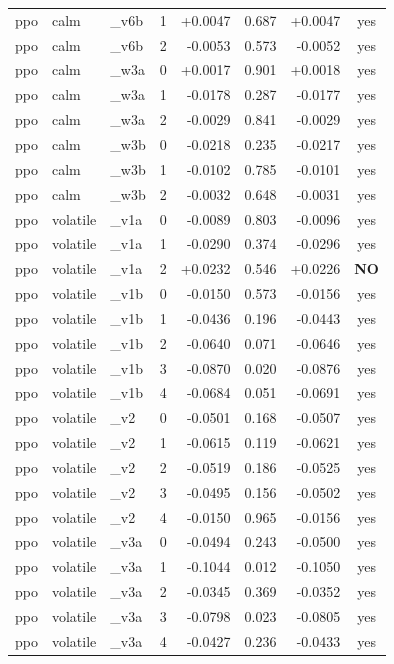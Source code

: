 \documentclass[11pt]{article}
\begin{document}
\begin{center}
\begin{longtable}{lllrrrrc}
ppo & calm & \_v6b & 1 & +0.0047 & 0.687 & +0.0047 & yes \\
ppo & calm & \_v6b & 2 & -0.0053 & 0.573 & -0.0052 & yes \\
ppo & calm & \_w3a & 0 & +0.0017 & 0.901 & +0.0018 & yes \\
ppo & calm & \_w3a & 1 & -0.0178 & 0.287 & -0.0177 & yes \\
ppo & calm & \_w3a & 2 & -0.0029 & 0.841 & -0.0029 & yes \\
ppo & calm & \_w3b & 0 & -0.0218 & 0.235 & -0.0217 & yes \\
ppo & calm & \_w3b & 1 & -0.0102 & 0.785 & -0.0101 & yes \\
ppo & calm & \_w3b & 2 & -0.0032 & 0.648 & -0.0031 & yes \\
ppo & volatile & \_v1a & 0 & -0.0089 & 0.803 & -0.0096 & yes \\
ppo & volatile & \_v1a & 1 & -0.0290 & 0.374 & -0.0296 & yes \\
ppo & volatile & \_v1a & 2 & +0.0232 & 0.546 & +0.0226 & \textbf{NO} \\
ppo & volatile & \_v1b & 0 & -0.0150 & 0.573 & -0.0156 & yes \\
ppo & volatile & \_v1b & 1 & -0.0436 & 0.196 & -0.0443 & yes \\
ppo & volatile & \_v1b & 2 & -0.0640 & 0.071 & -0.0646 & yes \\
ppo & volatile & \_v1b & 3 & -0.0870 & 0.020 & -0.0876 & yes \\
ppo & volatile & \_v1b & 4 & -0.0684 & 0.051 & -0.0691 & yes \\
ppo & volatile & \_v2 & 0 & -0.0501 & 0.168 & -0.0507 & yes \\
ppo & volatile & \_v2 & 1 & -0.0615 & 0.119 & -0.0621 & yes \\
ppo & volatile & \_v2 & 2 & -0.0519 & 0.186 & -0.0525 & yes \\
ppo & volatile & \_v2 & 3 & -0.0495 & 0.156 & -0.0502 & yes \\
ppo & volatile & \_v2 & 4 & -0.0150 & 0.965 & -0.0156 & yes \\
ppo & volatile & \_v3a & 0 & -0.0494 & 0.243 & -0.0500 & yes \\
ppo & volatile & \_v3a & 1 & -0.1044 & 0.012 & -0.1050 & yes \\
ppo & volatile & \_v3a & 2 & -0.0345 & 0.369 & -0.0352 & yes \\
ppo & volatile & \_v3a & 3 & -0.0798 & 0.023 & -0.0805 & yes \\
ppo & volatile & \_v3a & 4 & -0.0427 & 0.236 & -0.0433 & yes \\

\end{longtable}
\end{center}
\end{document}
